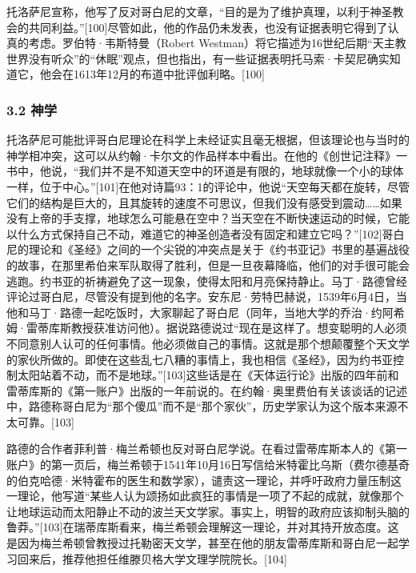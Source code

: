 托洛萨尼宣称，他写了反对哥白尼的文章，“目的是为了维护真理，以利于神圣教会的共同利益。”[100]尽管如此，他的作品仍未发表，也没有证据表明它得到了认真的考虑。罗伯特·韦斯特曼（Robert Westman）将它描述为16世纪后期“天主教世界没有听众”的“休眠”观点，但也指出，有一些证据表明托马索·卡契尼确实知道它，他会在1613年12月的布道中批评伽利略。[100]

\subsubsection{3.2 神学}
托洛萨尼可能批评哥白尼理论在科学上未经证实且毫无根据，但该理论也与当时的神学相冲突，这可以从约翰·卡尔文的作品样本中看出。在他的《创世记注释》一书中，他说，“我们并不是不知道天空中的环道是有限的，地球就像一个小的球体一样，位于中心。”[101]在他对诗篇93：1的评论中，他说“天空每天都在旋转，尽管它们的结构是巨大的，且其旋转的速度不可思议，但我们没有感受到震动……如果没有上帝的手支撑，地球怎么可能悬在空中？当天空在不断快速运动的时候，它能以什么方式保持自己不动，难道它的神圣创造者没有固定和建立它吗？”[102]哥白尼的理论和《圣经》之间的一个尖锐的冲突点是关于《约书亚记》书里的基遍战役的故事，在那里希伯来军队取得了胜利，但是一旦夜幕降临，他们的对手很可能会逃跑。约书亚的祈祷避免了这一现象，使得太阳和月亮保持静止。马丁·路德曾经评论过哥白尼，尽管没有提到他的名字。安东尼·劳特巴赫说，1539年6月4日，当他和马丁·路德一起吃饭时，大家聊起了哥白尼（同年，当地大学的乔治·约阿希姆·雷蒂库斯教授获准访问他）。据说路德说过“现在是这样了。想变聪明的人必须不同意别人认可的任何事情。他必须做自己的事情。这就是那个想颠覆整个天文学的家伙所做的。即使在这些乱七八糟的事情上，我也相信《圣经》，因为约书亚控制太阳站着不动，而不是地球。”[103]这些话是在《天体运行论》出版的四年前和雷蒂库斯的《第一账户》出版的一年前说的。在约翰·奥里费伯有关该谈话的记述中，路德称哥白尼为“那个傻瓜”而不是“那个家伙”，历史学家认为这个版本来源不太可靠。[103]

路德的合作者菲利普·梅兰希顿也反对哥白尼学说。在看过雷蒂库斯本人的《第一账户》的第一页后，梅兰希顿于1541年10月16日写信给米特霍比乌斯（费尔德基奇的伯克哈德·米特霍布的医生和数学家），谴责这一理论，并呼吁政府力量压制这一理论，他写道“某些人认为颂扬如此疯狂的事情是一项了不起的成就，就像那个让地球运动而太阳静止不动的波兰天文学家。事实上，明智的政府应该抑制头脑的鲁莽。”[103]在瑞蒂库斯看来，梅兰希顿会理解这一理论，并对其持开放态度。这是因为梅兰希顿曾教授过托勒密天文学，甚至在他的朋友雷蒂库斯和哥白尼一起学习回来后，推荐他担任维滕贝格大学文理学院院长。[104]

